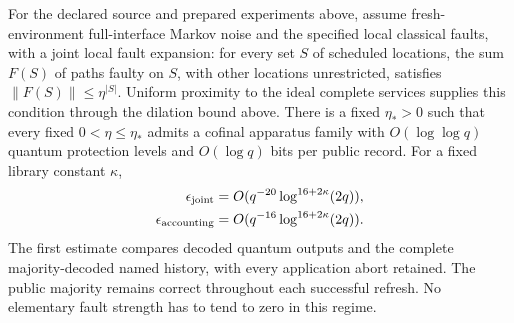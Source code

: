 \begin{theorem}
\label{thm:fixed-strength-public-history}
For the declared source and prepared experiments above, assume
fresh-environment full-interface Markov noise and the specified local
classical faults, with a joint local fault expansion: for every set $S$
of scheduled locations, the sum
$F(S)$ of paths faulty on $S$, with other locations unrestricted, satisfies
$\|F(S)\|\le\eta^{|S|}$. Uniform proximity to the ideal complete
services supplies this condition through the dilation bound above.
There is a fixed
$\eta_*>0$ such that every fixed $0<\eta\le\eta_*$ admits a cofinal
apparatus family with $O(\log\log q)$ quantum protection levels and
$O(\log q)$ bits per public record. For a fixed library constant $\kappa$,
\[
 \begin{aligned}
 \epsilon_{\rm joint}&=O(q^{-20}\log^{16+2\kappa}(2q)),\\
 \epsilon_{\rm accounting}&=O(q^{-16}\log^{16+2\kappa}(2q)).
 \end{aligned}
\]
The first estimate compares decoded quantum outputs and the complete
majority-decoded named history, with every application abort retained.
The public majority remains correct throughout each successful refresh.
No elementary fault strength has to tend to zero in this regime.
\end{theorem}


